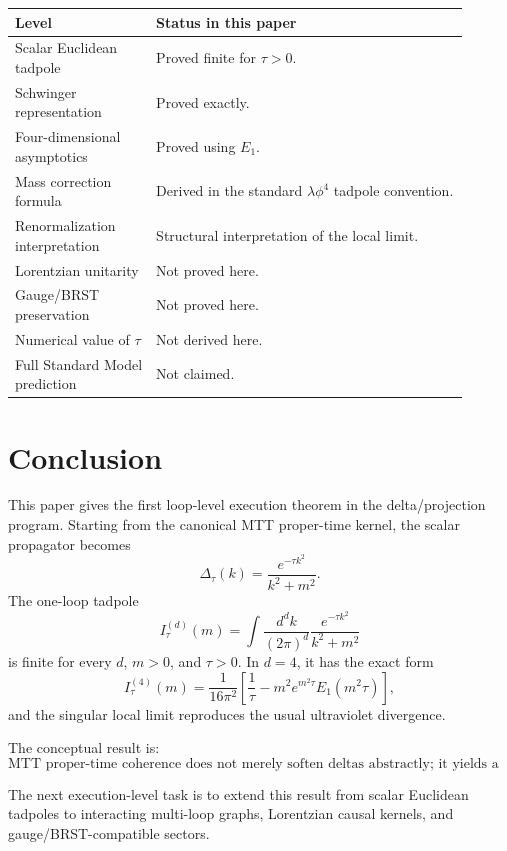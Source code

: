\documentclass[11pt]{article}
\begin{document}
\begin{center}
\begin{tabular}{p{0.28\linewidth}p{0.62\linewidth}}
\hline
\textbf{Level} & \textbf{Status in this paper}\\
\hline
Scalar Euclidean tadpole & Proved finite for \(\tau>0\).\\
Schwinger representation & Proved exactly.\\
Four-dimensional asymptotics & Proved using \(E_1\).\\
Mass correction formula & Derived in the standard \(\lambda\phi^4\) tadpole convention.\\
Renormalization interpretation & Structural interpretation of the local limit.\\
Lorentzian unitarity & Not proved here.\\
Gauge/BRST preservation & Not proved here.\\
Numerical value of \(\tau\) & Not derived here.\\
Full Standard Model prediction & Not claimed.\\
\hline
\end{tabular}
\end{center}

\section{Conclusion}

This paper gives the first loop-level execution theorem in the delta/projection program. Starting from the canonical MTT proper-time kernel, the scalar propagator becomes
\[
\Delta_\tau(k)=\frac{e^{-\tau k^2}}{k^2+m^2}.
\]
The one-loop tadpole
\[
I_\tau^{(d)}(m)
=
\int\frac{d^d k}{(2\pi)^d}
\frac{e^{-\tau k^2}}{k^2+m^2}
\]
is finite for every \(d\), \(m>0\), and \(\tau>0\). In \(d=4\), it has the exact form
\[
I_\tau^{(4)}(m)
=
\frac{1}{16\pi^2}
\left[
\frac{1}{\tau}
-
m^2e^{m^2\tau}E_1(m^2\tau)
\right],
\]
and the singular local limit reproduces the usual ultraviolet divergence.

The conceptual result is:
\[
\boxed{
\text{MTT proper-time coherence does not merely soften deltas abstractly; it yields a specific finite loop correction.}
}
\]

The next execution-level task is to extend this result from scalar Euclidean tadpoles to interacting multi-loop graphs, Lorentzian causal kernels, and gauge/BRST-compatible sectors.
\end{document}
